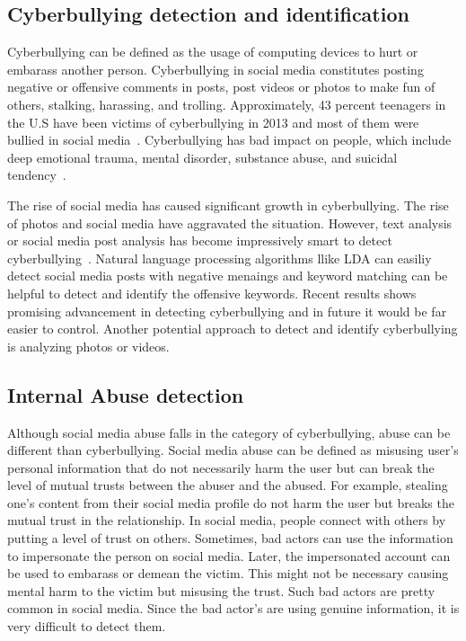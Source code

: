 \documentclass[sigconf]{acmart}
\begin{document}
\subsection{Cyberbullying detection and identification}
Cyberbullying can be defined as the usage of computing devices to hurt or embarass another person.  Cyberbullying in social media constitutes posting negative or offensive comments in posts, post videos or photos to make fun of others,  stalking, harassing, and trolling.  Approximately, 43 percent teenagers in the U.S have been victims of cyberbullying in 2013 and most of them were bullied in social media~\cite{cyberbullying}. Cyberbullying has bad impact on people, which include deep emotional trauma, mental disorder, substance abuse, and suicidal tendency~\cite{cb-effect}. 

The rise of social media has caused significant growth in cyberbullying. The rise of photos and social media have aggravated the situation. However, text analysis or social media post analysis has become impressively smart to detect cyberbullying~\cite{HosseinmardiMRH15}. Natural language processing algorithms llike LDA can easiliy detect social media posts with negative menaings and keyword matching can be helpful to detect and identify the offensive keywords. Recent results shows promising advancement in detecting cyberbullying and in future it would be far easier to control. Another potential approach to detect and identify cyberbullying is analyzing photos or videos.

\subsection{Internal Abuse detection}
Although social media abuse falls in the category of cyberbullying, abuse can be different than cyberbullying. Social media abuse can be defined as misusing user's personal information that do not necessarily harm the user but can break the level of mutual trusts between the abuser and the abused. For example, stealing one's content from their social media profile do not harm the user but breaks the mutual trust in the relationship. In social media, people connect with others by putting a level of trust on others. Sometimes, bad actors can use the information to impersonate the person on social media. Later, the impersonated account can be used to embarass or demean the victim. This might not be necessary causing mental harm to the victim but misusing the trust. Such bad actors are pretty common in social media. Since the bad actor's are using genuine information, it is very difficult to detect them.
\end{document}
